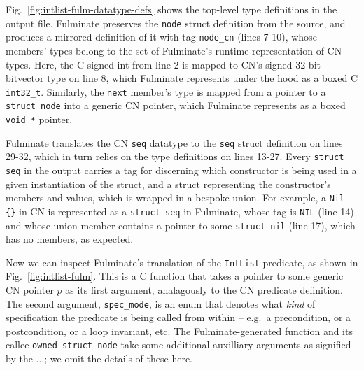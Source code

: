 Fig.~\ref{fig:intlist-fulm-datatype-defs} shows the top-level type definitions in the output file. Fulminate preserves the \texttt{node} struct definition from the source, and produces a mirrored definition of it with tag \texttt{node\_cn} (lines 7-10), whose members' types belong to the set of Fulminate's runtime representation of CN types. Here, the C signed int from line 2 is mapped to CN's signed 32-bit bitvector type on line 8, which Fulminate represents under the hood as a boxed C \texttt{int32\_t}. Similarly, the \texttt{next} member's type is mapped from a pointer to a \texttt{struct node} into a generic CN pointer, which Fulminate represents as a boxed \texttt{void *} pointer. 

Fulminate translates the CN \texttt{seq} datatype to the \texttt{seq} struct definition on lines 29-32, which in turn relies on the type definitions on lines 13-27. Every \texttt{struct seq} in the output carries a tag for discerning which constructor is being used in a given instantiation of the struct, and a struct representing the constructor's members and values, which is wrapped in a bespoke union. For example, a \texttt{Nil \{\}} in CN is represented as a \texttt{struct seq} in Fulminate, whose tag is \texttt{NIL} (line 14) and whose union member contains a pointer to some \texttt{struct nil} (line 17), which has no members, as expected.

Now we can inspect Fulminate's translation of the \texttt{IntList} predicate, as shown in Fig.~\ref{fig:intlist-fulm}. This is a C function that takes a pointer to some generic CN pointer $p$ as its first argument, analagously to the CN predicate definition. The second argument, \texttt{spec\_mode}, is an enum that denotes what \emph{kind} of specification the predicate is being called from within -- e.g.~a precondition, or a postcondition, or a loop invariant, etc. The Fulminate-generated function and its callee \texttt{owned\_struct\_node} take some additional auxilliary arguments as signified by the $\ldots$; we omit the details of these here. 

